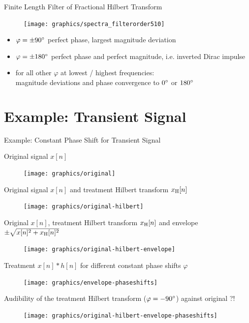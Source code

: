 \documentclass[mathserif]{intbeamer}
\begin{document}
%
%
%
\begin{frame}{Finite Length Filter of Fractional Hilbert Transform}
\begin{figure}
\texttt{[image: graphics/spectra\_filterorder510]}
\end{figure}

\begin{itemize}
\item $\varphi=\pm 90\degree$ perfect phase, largest magnitude deviation
\item $\varphi=\pm 180\degree$ perfect phase and perfect magnitude, i.e. inverted Dirac impulse
\item for all other $\varphi$ at lowest / highest frequencies:\\
magnitude deviations and phase convergence to $0\degree$ or $180\degree$
\end{itemize}
\end{frame}
%
%
%
\section{Example: Transient Signal}
\begin{frame}{Example: Constant Phase Shift for Transient Signal}
{
Original signal $x[n]$
\begin{figure}
\texttt{[image: graphics/original]}
\end{figure}
}
{
Original signal $x[n]$ and treatment Hilbert transform $x_{\mathrm{H}}[n]$
\begin{figure}
\texttt{[image: graphics/original-hilbert]}
\end{figure}
}
{
Original $x[n]$, treatment Hilbert transform $x_{\mathrm{H}}[n]$ and envelope
$\pm\sqrt{x[n]^2+x_{\mathrm{H}}[n]^2}$
\begin{figure}
\texttt{[image: graphics/original-hilbert-envelope]}
\end{figure}
}
{
Treatment $x[n]\ast h[n]$ for different constant phase shifts $\varphi$
\begin{figure}
\texttt{[image: graphics/envelope-phaseshifts]}
\end{figure}
}
{
Audibility of the treatment Hilbert transform ($\varphi=-90\degree$) against original ?!
\begin{figure}
\texttt{[image: graphics/original-hilbert-envelope-phaseshifts]}
\end{figure}
}
\end{frame}
%
%
%
\end{document}
